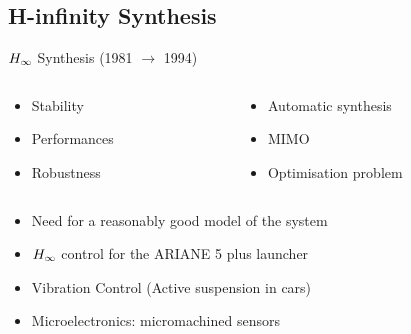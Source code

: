 \documentclass[../main/main.tex]{subfiles}
\begin{document}


\subsection{H-infinity Synthesis}
\begin{frame}[t]{\(H_{\infty}\) Synthesis (1981 \(\rightarrow\) 1994)}
  \begin{tcolorbox}[size=small, top=4pt, colback=green!5!white,colframe=green!75!black,title=Advantages]
    \vspace{-1em}\begin{columns}
      \begin{column}{0.5\textwidth}
        \begin{itemize}
        \item Stability
        \item Performances
        \item Robustness %
        \end{itemize}
      \end{column}
      \begin{column}{0.5\textwidth}
        \begin{itemize}
        \item Automatic synthesis
        \item MIMO
        \item Optimisation problem
        \end{itemize}
      \end{column}
    \end{columns}
  \end{tcolorbox}
  \begin{tcolorbox}[size=small, top=4pt, colback=red!5!white,colframe=red!75!black,title=Disadvantages]
    \begin{itemize}
    \item Need for a reasonably good model of the system
    \end{itemize}
  \end{tcolorbox}
  \begin{tcolorbox}[size=small, colback=blue!5!white,colframe=blue!75!black,title=Applications]
    \begin{itemize}
    \item \(H_{\infty}\) control for the ARIANE 5 plus launcher
    \item Vibration Control (Active suspension in cars)
    \item Microelectronics: micromachined sensors
    \end{itemize}
  \end{tcolorbox}
\end{frame}
\end{document}

